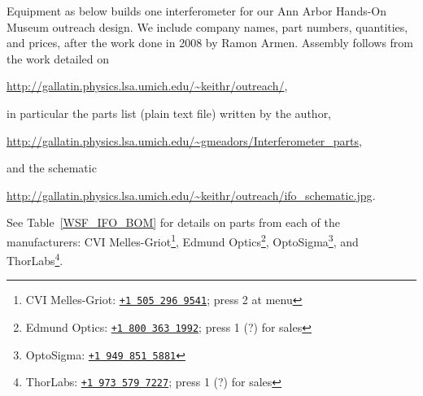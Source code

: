 Equipment as below builds one interferometer for our Ann Arbor Hands-On
Museum outreach design. 
We include company names, part numbers, quantities, and
prices, after the work done in 2008 by Ramon Armen. 
Assembly follows from the
work detailed on

\url{http://gallatin.physics.lsa.umich.edu/~keithr/outreach/}, 

in particular the parts list (plain text file) written by the author,

\url{http://gallatin.physics.lsa.umich.edu/~gmeadors/Interferometer_parts},

and the schematic 

\url{http://gallatin.physics.lsa.umich.edu/~keithr/outreach/ifo_schematic.jpg}. 

See Table~\ref{WSF_IFO_BOM} for details on parts from each of the manufacturers:
CVI Melles-Griot\footnote{CVI Melles-Griot: \href{tel:15052969541}{\texttt{+1 505 296 9541}}; press 2 at menu},
Edmund Optics\footnote{Edmund Optics: \href{tel:18003631992}{\texttt{+1 800 363 1992}}; press 1 (?) for sales},
OptoSigma\footnote{OptoSigma: \href{tel:19498515881}{\texttt{+1 949 851 5881}} }, and
ThorLabs\footnote{ThorLabs: \href{tel:19735797227}{\texttt{+1 973 579 7227}}; press 1 (?) for sales}.

